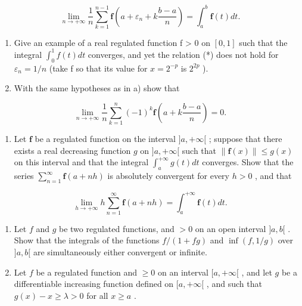 \[
\lim _ {n \rightarrow + \infty} \frac {1}{n} \sum_ {k = 1} ^ {n - 1} \mathbf {f} \left(a + \varepsilon_ {n} + k \frac {b - a}{n}\right) = \int_ {a} ^ {b} \mathbf {f} (t) d t.\tag{*}
\]

\begin{enumerate}
\def\labelenumi{\alph{enumi})}
\setcounter{enumi}{1}
\item
  Give an example of a real regulated function f \textgreater{} 0 on \([0,1]\) such that the integral \(\int_{0}^{1} f(t) dt\) converges, and yet the relation (*) does not hold for \(\varepsilon_{n} = 1/n\) (take f so that its value for \(x = 2^{-p}\) is \(2^{2p}\) ).
\item
  With the same hypotheses as in a) show that
\end{enumerate}

\[
\lim _ {n \rightarrow + \infty} \frac {1}{n} \sum_ {k = 1} ^ {n} (- 1) ^ {k} \mathbf {f} \left(a + k \frac {b - a}{n}\right) = 0.
\]

\begin{enumerate}
\def\labelenumi{\arabic{enumi})}
\setcounter{enumi}{5}
\tightlist
\item
  Let \(\mathbf{f}\) be a regulated function on the interval \(]a, +\infty[\) ; suppose that there exists a real decreasing function \(g\) on \(]a, +\infty[\) such that \(\| \mathbf{f}(x)\| \leqslant g(x)\) on this interval and that the integral \(\int_{a}^{+\infty}g(t)dt\) converges. Show that the series \(\sum_{n=1}^{\infty}\mathbf{f}(a + nh)\) is absolutely convergent for every \(h > 0\) , and that
\end{enumerate}

\[
\lim _ {h \rightarrow + \infty} h \sum_ {n = 1} ^ {\infty} \mathbf {f} (a + n h) = \int_ {a} ^ {+ \infty} \mathbf {f} (t) d t.
\]

\begin{enumerate}
\def\labelenumi{\arabic{enumi})}
\setcounter{enumi}{6}
\item
  Let \(f\) and \(g\) be two regulated functions, and \(>0\) on an open interval \(]a, b[\) . Show that the integrals of the functions \(f / (1 + fg)\) and \(\inf(f, 1/g)\) over \(]a, b[\) are simultaneously either convergent or infinite.
\item
  Let \(f\) be a regulated function and \(\geqslant 0\) on an interval \([a, +\infty[\) , and let \(g\) be a differentiable increasing function defined on \([a, +\infty[\) , and such that \(g(x) - x \geqslant \lambda > 0\) for all \(x \geqslant a\) .
\end{enumerate}

